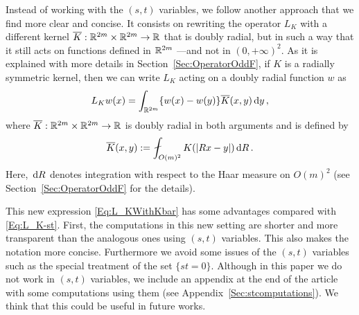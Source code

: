 Instead of working with the $(s,t)$ variables, we follow another approach that we find more clear and concise. It consists on rewriting the operator $L_K$ with a different kernel $\overline{K} : \mathbb{R}^{2m}\times \mathbb{R}^{2m} \to \mathbb{R}$ that is doubly radial, but in such a way that it still acts on functions defined in $\mathbb{R}^{2m}$ ---and not in $(0,+\infty)^2$. As it is explained with more details in Section~\ref{Sec:OperatorOddF}, if $K$ is a radially symmetric kernel, then we can write $L_K$ acting on a doubly radial function $w$ as
\begin{equation}
\label{Eq:L_KWithKbar}
L_K w(x) = \int_{\mathbb{R}^{2m}} \{w(x) - w(y)\} \overline{K}(x,y) \,\mathrm{d} y\,,
\end{equation}
where $\overline{K} : \mathbb{R}^{2m}\times \mathbb{R}^{2m} \to \mathbb{R}$ is doubly radial in both arguments and is defined by
\begin{equation}
\label{Eq:KbarDef'}
\overline{K}(x,y) := \average_{O(m)^2} K(|Rx - y|)\d R\,.
\end{equation}
Here, $\,\mathrm{d} R$ denotes integration with respect to the Haar measure on $O(m)^2$ (see Section~\ref{Sec:OperatorOddF} for the details).

This new expression \eqref{Eq:L_KWithKbar} has some advantages compared with \eqref{Eq:L_K-st}. First, the computations in this new setting are shorter and more transparent than the analogous ones using $(s,t)$ variables. This also makes the notation more concise. Furthermore we avoid some issues of the $(s,t)$ variables such as the special treatment of the set $\{st=0\}$. Although in this paper we do not work in $(s,t)$ variables, we include an appendix at the end of the article with some computations using them (see Appendix~\ref{Sec:stcomputations}). We think that this could be useful in future works.  



